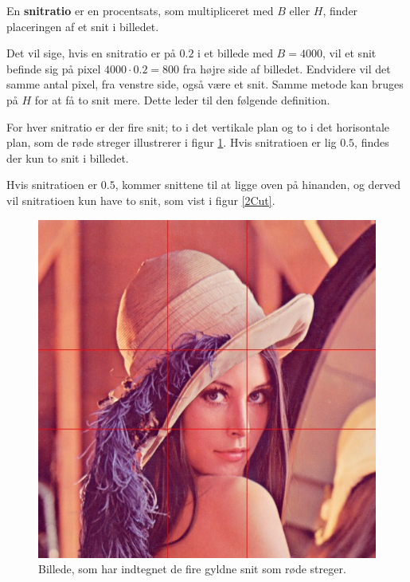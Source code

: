 {\begin{definition}
	En \textbf{snitratio} er en procentsats, som multipliceret med $B$ eller
	$H$, finder placeringen af et snit i billedet.
\end{definition}

Det vil sige, hvis en snitratio er på $0.2$ i et billede med $B =
4000$, vil et snit befinde sig på pixel $4000 \cdot 0.2 = 800$ fra højre side af
billedet. Endvidere vil det samme antal pixel, fra venstre side, også være et snit.
Samme metode kan bruges på $H$ for at få to snit mere. Dette leder til
den følgende definition.

\begin{definition}
	For hver snitratio er der fire snit; to i det vertikale plan og to i
	det horisontale plan, som de røde streger illustrerer i figur
    \ref{lenasnit2}. Hvis snitratioen er lig $0.5$, findes der kun to
    snit i billedet.
\end{definition}

Hvis snitratioen er $0.5$, kommer snittene til at ligge oven på hinanden,
og derved vil snitratioen kun have to snit, som vist i figur \ref{2Cut}.

\begin{figure}[!h]
    \centering
    \includegraphics[scale=0.42,angle=0]{afsnit/vores_implementation/billeder/naiv_algoritme/Lenagolden}
    \caption[]{Billede, som har indtegnet de fire gyldne snit som røde
    streger.}
    \label{lenasnit2}
\end{figure}

}

